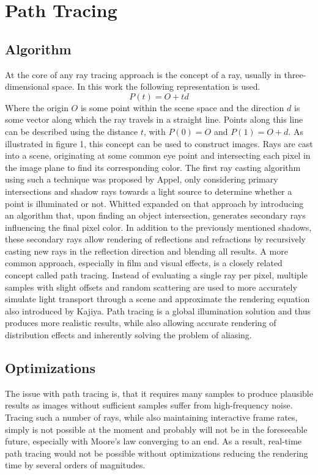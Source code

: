 \section{Path Tracing}
\subsection{Algorithm}
At the core of any ray tracing approach is the concept of a ray, usually in three-dimensional space. In this work the following representation is used.
\[P(t)=O+td\]
Where the origin $O$ is some point within the scene space and the direction $d$ is some vector along which the ray travels in a straight line. Points along this line can be described using the distance $t$, with $P(0)=O$ and $P(1)=O+d$. 
As illustrated in figure 1, this concept can be used to construct images. Rays are cast into a scene, originating at some common eye point and intersecting each pixel in the image plane to find its corresponding color. The first ray casting algorithm using such a technique was proposed by Appel\cite{appel1968}, only considering primary intersections and shadow rays towards a light source to determine whether a point is illuminated or not. Whitted\cite{whitted_improved_1980} expanded on that approach by introducing an algorithm that, upon finding an object intersection, generates secondary rays influencing the final pixel color. In addition to the previously mentioned shadows, these secondary rays allow rendering of reflections and refractions by recursively casting new rays in the reflection direction and blending all results. 
A more common approach, especially in film and visual effects\cite{keller2015path_tracing_revolution}, is a closely related concept called path tracing\cite{kajiya_rendering_1986}. Instead of evaluating a single ray per pixel, multiple samples with slight offsets and random scattering are used to more accurately simulate light transport through a scene and approximate the rendering equation also introduced by Kajiya. Path tracing is a global illumination solution and thus produces more realistic results, while also allowing accurate rendering of distribution effects\cite{cook_distributed_1984} and inherently solving the problem of aliasing. 
\subsection{Optimizations}
The issue with path tracing is, that it requires many samples to produce plausible results as images without sufficient samples suffer from high-frequency noise. Tracing such a number of rays, while also maintaining interactive frame rates, simply is not possible at the moment and probably will not be in the foreseeable future, especially with Moore's law converging to an end. As a result, real-time path tracing would not be possible without optimizations reducing the rendering time by several orders of magnitudes. 
